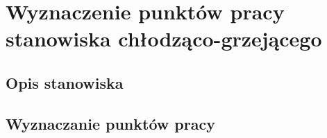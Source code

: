 \chapter{Wyznaczenie punktów pracy stanowiska chłodząco-grzejącego}
\label{thermal_punkty_pracy}

\section{Opis stanowiska}
\label{thermal_opis_stanowiska}

\section{Wyznaczanie punktów pracy}
\label{thermal_punkty_pracy}

